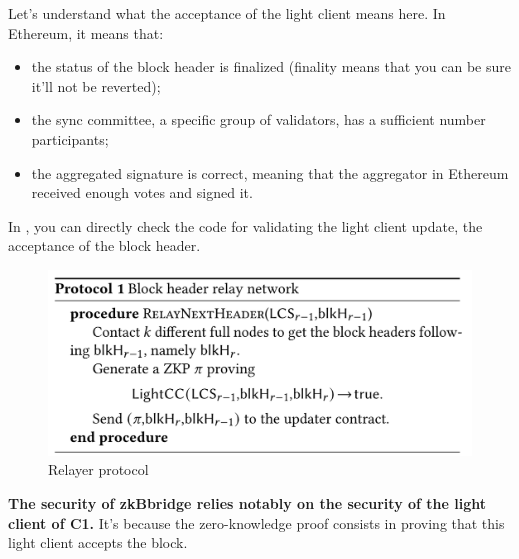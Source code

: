 Let's understand what the acceptance of the light client means here. 
In Ethereum, it means that: 
\begin{itemize}
    \item the status of the block header is finalized (finality means that you can be sure it'll not be reverted);
    \item the sync committee, a specific group of validators, has a sufficient number participants;
    \item the aggregated signature is correct, meaning that the aggregator in Ethereum received enough votes and signed it.
\end{itemize}
In \cite{ethereumlcvalidation}, you can directly check the code for validating the light client update, the acceptance of the block header.  
\begin{figure}[H]
    \centering
    \includegraphics[width=0.6\linewidth]{interoperability/zkbridgeprotocol.png}
    \caption{Relayer protocol \cite{xie2022zkbridge}}
    \label{fig:zkbrigdeprotocol}
\end{figure}

\textbf{The security of zkBbridge relies notably on the security of the light client of C1.} It's because the zero-knowledge proof consists in proving that this light client accepts the block.


\fi
